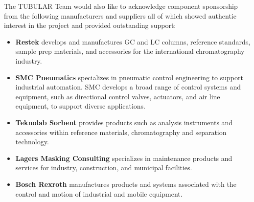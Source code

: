 The TUBULAR Team would also like to acknowledge component sponsorship from the following manufacturers and suppliers all of which showed authentic interest in the project and provided outstanding support:

\begin{itemize}
  \item \textbf{Restek} develops and manufactures GC and LC columns, reference standards, sample prep materials, and accessories for the international chromatography industry. 
  \item \textbf{SMC Pneumatics} specializes in pneumatic control engineering to support industrial automation. SMC develops a broad range of control systems and equipment, such as directional control valves, actuators, and air line equipment, to support diverse applications.
  \item \textbf{Teknolab Sorbent} provides products such as  analysis instruments and accessories within reference materials, chromatography and separation technology.
  \item \textbf{Lagers Masking Consulting} specializes in maintenance products and services for industry, construction, and municipal facilities.
  \item \textbf{Bosch Rexroth} manufactures products and systems associated with the control and motion of industrial and mobile equipment.
\end{itemize}